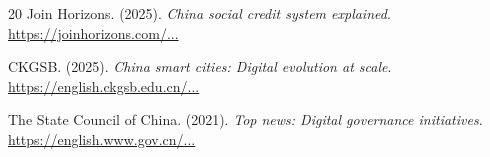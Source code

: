 \documentclass[12pt,a4paper]{article}
\begin{document}
\begin{thebibliography}{20}
Join Horizons. (2025). \textit{China social credit system explained}. 
\href{https://joinhorizons.com/china-social-credit-system-explained/}{https://joinhorizons.com/...}

CKGSB. (2025). \textit{China smart cities: Digital evolution at scale}. 
\href{https://english.ckgsb.edu.cn/knowledge/article/china-smart-cities-digital-evolution-at-scale/}{https://english.ckgsb.edu.cn/...}

The State Council of China. (2021). \textit{Top news: Digital governance initiatives}. 
\href{https://english.www.gov.cn/news/topnews/202105/26/content_WS60ae50dcc6d0df57f98da3d6.html}{https://english.www.gov.cn/...}

\end{thebibliography}
\end{document}
